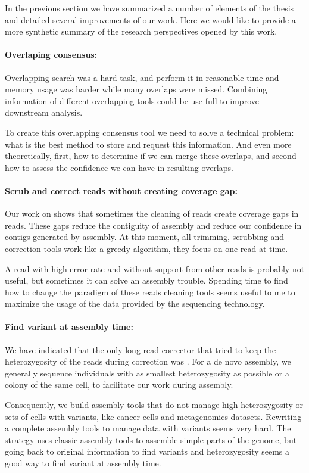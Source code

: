 \documentclass[main.tex]{subfiles}
\begin{document}
In the previous section we have summarized a number of elements of the thesis and detailed several improvements of our work. Here we would like to provide a more synthetic summary of the research perspectives opened by this work.

\paragraph{Overlaping consensus:} Overlapping search was a hard task, and perform it in reasonable time and memory usage was harder while many overlaps were missed. Combining information of different overlapping tools could be use full to improve downstream analysis.

To create this overlapping consensus tool we need to solve a technical problem: what is the best method to store and request this information. And even more theoretically, first, how to determine if we can merge these overlaps, and second how to assess the confidence we can have in resulting overlaps.

\paragraph{Scrub and correct reads without creating coverage gap:} Our work on \knot shows that sometimes the cleaning of reads create coverage gaps in reads. These gaps reduce the contiguity of assembly and reduce our confidence in contigs generated by assembly. At this moment, all trimming, scrubbing and correction tools work like a greedy algorithm, they focus on one read at time.

A read with high error rate and without support from other reads is probably not useful, but sometimes it can solve an assembly trouble. Spending time to find how to change the paradigm of these reads cleaning tools seems useful to me to maximize the usage of the data provided by the sequencing technology.

\paragraph{Find variant at assembly time:} We have indicated that the only long read corrector that tried to keep the heterozygosity of the reads during correction was . For a de novo assembly, we generally sequence individuals with as smallest heterozygosity as possible or a colony of the same cell, to facilitate our work during assembly.

Consequently, we build assembly tools that do not manage high heterozygosity or sets of cells with variants, like cancer cells and metagenomics datasets. Rewriting a complete assembly tools to manage data with variants seems very hard. The \knot strategy uses classic assembly tools to assemble simple parts of the genome, but going back to original information to find variants and heterozygosity seems a good way to find variant at assembly time.
\end{document}
